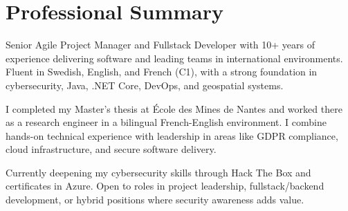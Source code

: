 \section{Professional Summary}
Senior Agile Project Manager and Fullstack Developer with 10+ years of experience delivering software and leading teams in international environments. Fluent in Swedish, English, and French (C1), with a strong foundation in cybersecurity, Java, .NET Core, DevOps, and geospatial systems.

I completed my Master’s thesis at École des Mines de Nantes and worked there as a research engineer in a bilingual French-English environment. I combine hands-on technical experience with leadership in areas like GDPR compliance, cloud infrastructure, and secure software delivery.

Currently deepening my cybersecurity skills through Hack The Box and certificates in Azure. Open to roles in project leadership, fullstack/backend development, or hybrid positions where security awareness adds value.
